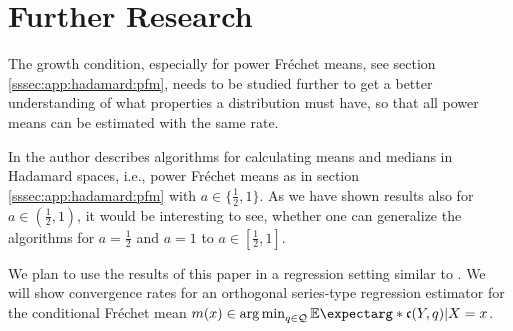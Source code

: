 \section{Further Research}
%
The growth condition, especially for power Fréchet means, see section \ref{sssec:app:hadamard:pfm}, needs to be studied further to get a better understanding of what properties a distribution must have, so that all power means can be estimated with the same rate.

In \cite{bacak14} the author describes algorithms for calculating means and medians in Hadamard spaces, i.e., power Fréchet means as in section \ref{sssec:app:hadamard:pfm} with $a\in\{\frac12, 1\}$. As we have shown results also for $a \in (\frac12,1)$, it would be interesting to see, whether one can generalize the algorithms for $a = \frac12$ and $a=1$ to $a\in[\frac12, 1]$.

We plan to use the results of this paper in a regression setting similar to \cite{petersen16}. We will show convergence rates for an orthogonal series-type regression estimator for the conditional Fréchet mean $m(x) \in \argmin_{q\in\mc Q}\Ex*{\mf c(Y,q) | X=x}$.
%
%